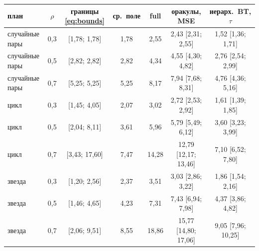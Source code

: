 \begin{tabular}{lc c cc cc}
\toprule
план & $\rho$ & границы \eqref{eq:bounds} & ср.\ поле & full & оракулы, MSE & иерарх.\ BT, $\tau$ \\
\midrule
случайные пары & 0{,}3 & [1{,}78; 1{,}78] & 1{,}78 & 2{,}55 & 2{,}43 \scriptsize[2{,}31; 2{,}55] & 1{,}52 \scriptsize[1{,}36; 1{,}71] \\
случайные пары & 0{,}5 & [2{,}82; 2{,}82] & 2{,}82 & 4{,}34 & 4{,}55 \scriptsize[4{,}30; 4{,}82] & 2{,}76 \scriptsize[2{,}54; 2{,}99] \\
случайные пары & 0{,}7 & [5{,}25; 5{,}25] & 5{,}25 & 8{,}17 & 7{,}94 \scriptsize[7{,}68; 8{,}31] & 4{,}76 \scriptsize[4{,}36; 5{,}16] \\
цикл & 0{,}3 & [1{,}45; 4{,}05] & 2{,}07 & 3{,}02 & 2{,}72 \scriptsize[2{,}53; 2{,}92] & 1{,}61 \scriptsize[1{,}39; 1{,}85] \\
цикл & 0{,}5 & [2{,}04; 8{,}11] & 3{,}61 & 5{,}96 & 5{,}79 \scriptsize[5{,}49; 6{,}12] & 3{,}60 \scriptsize[3{,}23; 3{,}99] \\
цикл & 0{,}7 & [3{,}43; 17{,}60] & 7{,}47 & 14{,}28 & 12{,}79 \scriptsize[12{,}17; 13{,}46] & 7{,}10 \scriptsize[6{,}52; 7{,}80] \\
звезда & 0{,}3 & [1{,}20; 2{,}56] & 2{,}37 & 3{,}51 & 3{,}03 \scriptsize[2{,}86; 3{,}22] & 1{,}86 \scriptsize[1{,}54; 2{,}16] \\
звезда & 0{,}5 & [1{,}46; 4{,}65] & 4{,}23 & 7{,}31 & 7{,}43 \scriptsize[6{,}94; 7{,}98] & 4{,}37 \scriptsize[3{,}86; 4{,}82] \\
звезда & 0{,}7 & [2{,}06; 9{,}51] & 8{,}55 & 18{,}86 & 15{,}77 \scriptsize[14{,}80; 17{,}06] & 9{,}05 \scriptsize[7{,}96; 10{,}25] \\
\bottomrule
\end{tabular}
